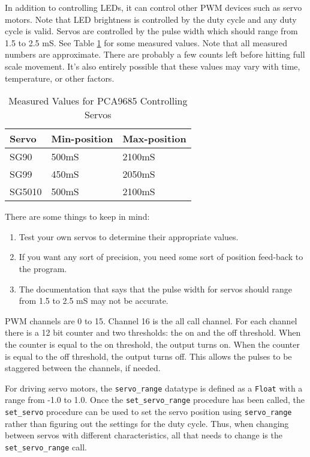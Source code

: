 \documentclass[10pt, openany]{book}
\newcommand{\function}[1]{\texttt{#1}}
\newcommand{\datatype}[1]{\texttt{#1}}
\begin{document}
In addition to controlling LEDs, it can control other PWM devices such as servo motors.  Note that LED brightness is controlled by the duty cycle and any duty cycle is valid.  Servos are controlled by the pulse width which should range from 1.5 to 2.5 mS.  See Table \ref{tbl:PCA9685Servo} for some measured values.  Note that all measured numbers are approximate.  There are probably a few  counts left before hitting full scale movement.  It's also entirely possible  that these values may vary with time, temperature, or other factors.

\begin{table}[!h]
\begin{center}
  \begin{tabular}{l|l|l}
    Servo & Min-position & Max-position \\
    \hline
    SG90 & 500mS & 2100mS \\
    SG99 & 450mS & 2050mS \\
    SG5010 & 500mS & 2100mS \\
  \end{tabular}
  \caption{Measured Values for PCA9685 Controlling Servos}
  \label{tbl:PCA9685Servo}
\end{center}
\end{table}

There are some things to keep in mind:
\begin{enumerate}
  \item Test your own servos to determine their appropriate values.
  \item If you want any sort of precision, you need some sort of position feed-back to the program.
  \item The documentation that says that the pulse width for servos should range from 1.5 to 2.5 mS may not be accurate.
\end{enumerate}

PWM channels are 0 to 15.  Channel 16 is the all call channel.  For each channel there is a 12 bit counter and two thresholds: the on and the off threshold.  When the counter is equal to the on threshold, the output turns on.  When the counter is equal to the off threshold, the output turns off.  This allows the pulses to be staggered between the channels, if needed.

For driving servo motors, the \datatype{servo\_range} datatype is defined as a \datatype{Float} with a range from -1.0 to 1.0.  Once the \function{set\_servo\_range} procedure has been called, the \function{set\_servo} procedure can be used to set the servo position using \datatype{servo\_range} rather than figuring out the settings for the duty cycle.  Thus, when changing between servos with different characteristics, all that needs to change is the \function{set\_servo\_range} call.
\end{document}

